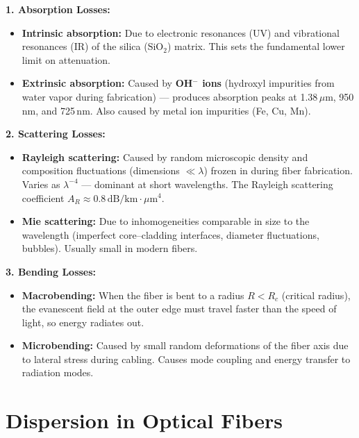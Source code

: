 \documentclass[12pt,a4paper]{article}
\begin{document}
\textbf{1. Absorption Losses:}
\begin{itemize}[leftmargin=*, itemsep=2pt]
  \item \textbf{Intrinsic absorption:} Due to electronic resonances (UV) and vibrational resonances (IR) of the silica ($\text{SiO}_2$) matrix. This sets the fundamental lower limit on attenuation.
  \item \textbf{Extrinsic absorption:} Caused by \textbf{OH$^-$ ions} (hydroxyl impurities from water vapor during fabrication) --- produces absorption peaks at 1.38\,$\mu$m, 950\,nm, and 725\,nm. Also caused by metal ion impurities (Fe, Cu, Mn).
\end{itemize}

\textbf{2. Scattering Losses:}
\begin{itemize}[leftmargin=*, itemsep=2pt]
  \item \textbf{Rayleigh scattering:} Caused by random microscopic density and composition fluctuations (dimensions $\ll \lambda$) frozen in during fiber fabrication. Varies as $\lambda^{-4}$ --- dominant at short wavelengths. The Rayleigh scattering coefficient $A_R \approx 0.8\,\text{dB/km}\cdot\mu\text{m}^4$.
  \item \textbf{Mie scattering:} Due to inhomogeneities comparable in size to the wavelength (imperfect core--cladding interfaces, diameter fluctuations, bubbles). Usually small in modern fibers.
\end{itemize}

\textbf{3. Bending Losses:}
\begin{itemize}[leftmargin=*, itemsep=2pt]
  \item \textbf{Macrobending:} When the fiber is bent to a radius $R < R_c$ (critical radius), the evanescent field at the outer edge must travel faster than the speed of light, so energy radiates out.
  \item \textbf{Microbending:} Caused by small random deformations of the fiber axis due to lateral stress during cabling. Causes mode coupling and energy transfer to radiation modes.
\end{itemize}

\section{Dispersion in Optical Fibers}
\end{document}

